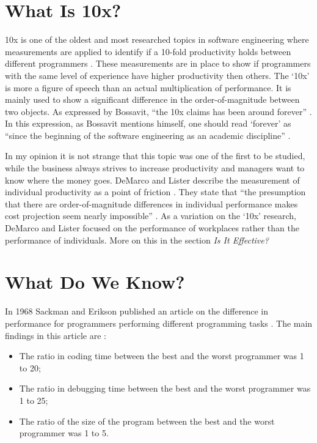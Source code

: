 \section*{What Is 10x?}

10x is one of the oldest and most researched topics in software engineering where measurements are applied to identify if a 10-fold productivity holds between different programmers \autocite[567]{MAKING_SOFTWARE}.
These measurements are in place to show if programmers with the same level of experience have higher productivity then others.
The `10x' is more a figure of speech than an actual multiplication of performance.
It is mainly used to show a significant difference in the order-of-magnitude between two objects.
As expressed by Bossavit, ``the 10x claims has been around forever'' \autocite[37]{bossavit2013leprechauns}.
In this expression, as Bossavit mentions himself, one should read `forever' as ``since the beginning of the software engineering as an academic discipline'' \autocite[38-39]{bossavit2013leprechauns}.

In my opinion it is not strange that this topic was one of the first to be studied, while the business always strives to increase productivity and managers want to know where the money goes.
DeMarco and Lister describe the measurement of individual productivity as a point of friction \autocite[268]{demarco1985programmer}.
They state that ``the presumption that there are order-of-magnitude differences in individual performance makes cost projection seem nearly impossible'' \autocite[268]{demarco1985programmer}.
As a variation on the `10x' research, DeMarco and Lister focused on the performance of workplaces rather than the performance of individuals.
More on this in the section \textit{Is It Effective?}

\section*{What Do We Know?}

In 1968 Sackman and Erikson published an article on the difference in performance for programmers performing different programming tasks \autocite{sackman1968exploratory}.
The main findings in this article are \autocite{sackman1968exploratory}\autocite[567]{MAKING_SOFTWARE}:
\begin{itemize}[noitemsep]
\item The ratio in coding time between the best and the worst programmer was 1 to 20;
\item The ratio in debugging time between the best and the worst programmer was 1 to 25;
\item The ratio of the size of the program between the best and the worst programmer was 1 to 5.
\end{itemize}

